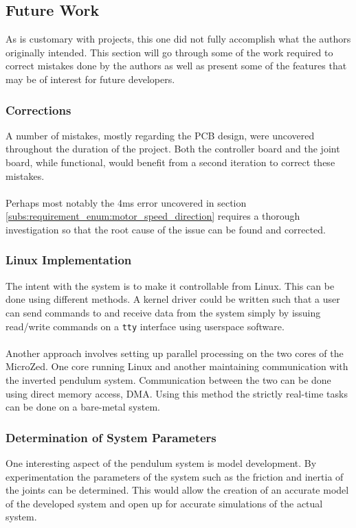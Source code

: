 \subsection{Future Work}
\label{sub:future_work}
As is customary with projects, this one did not fully accomplish what the authors originally intended.
This section will go through some of the work required to correct mistakes done by the authors as well as present some of the features that may be of interest for future developers.

\subsubsection{Corrections} %
\label{ssub:corrections}
A number of mistakes, mostly regarding the PCB design, were uncovered throughout the duration of the project.
Both the controller board and the joint board, while functional, would benefit from a second iteration to correct these mistakes.
\\~\\
Perhaps most notably the 4ms error uncovered in section \ref{subs:requirement_enum:motor_speed_direction} requires a thorough investigation so that the root cause of the issue can be found and corrected. 
\subsubsection{Linux Implementation} %
\label{ssub:linux_implementation}
The intent with the system is to make it controllable from Linux.
This can be done using different methods.
A kernel driver could be written such that a user can send commands to and receive data from the system simply by issuing read/write commands on a \texttt{tty} interface using userspace software.
\\~\\
Another approach involves setting up parallel processing on the two cores of the MicroZed.
One core running Linux and another maintaining communication with the inverted pendulum system.
Communication between the two can be done using direct memory access, DMA.
Using this method the strictly real-time tasks can be done on a bare-metal system.
\subsubsection{Determination of System Parameters} %
\label{ssub:determination_of_system_parameters}
One interesting aspect of the pendulum system is model development.
By experimentation the parameters of the system such as the friction and inertia of the joints can be determined.
This would allow the creation of an accurate model of the developed system and open up for accurate simulations of the actual system.

